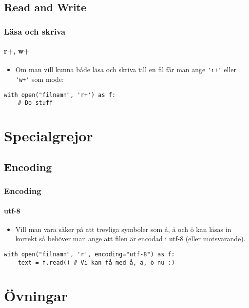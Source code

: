 \documentclass[aspectratio=169]{beamer}
\newcommand{\code}[1]{\colorbox{white}{\lstinline{#1}}}
\begin{document}
	\subsection{Read and Write}
	
	\begin{frame}[fragile]
		\frametitle{Läsa och skriva}
		\framesubtitle{r+, w+}
		
		\begin{itemize}
			\item Om man vill kunna både läsa och skriva till en fil får man ange \code{'r+'} eller \code{'w+'} som mode:
		\end{itemize}
		
		\begin{lstlisting}
with open("filnamn", 'r+') as f:
	# Do stuff
		\end{lstlisting}
		
	\end{frame}

\section{Specialgrejor}

	\subsection{Encoding}
	
	\begin{frame}[fragile]
		\frametitle{Encoding}
		\framesubtitle{utf-8}
		
		\begin{itemize}
			\item Vill man vara säker på att trevliga symboler som å, ä och ö kan läsas in korrekt så behöver man ange att filen är encodad i utf-8 (eller motsvarande).
		\end{itemize}
		
		\begin{lstlisting}
with open("filnamn", 'r', encoding="utf-8") as f:
	text = f.read() # Vi kan få med å, ä, ö nu :)
		\end{lstlisting}
	
	\end{frame}
	

\section{Övningar}
\end{document}
